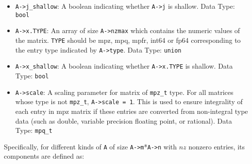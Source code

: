 \documentclass[12pt]{article}
\theoremstyle{definition}
\begin{document}
\begin{itemize}
\item \verb|A->j_shallow|: A boolean indicating whether \verb|A->j| is shallow.
Data Type: \verb|bool|

\item \verb|A->x.TYPE|: An array of size \verb|A->nzmax| which contains the
numeric values of the matrix. \verb|TYPE| should be mpz, mpq, mpfr, int64 or
fp64 corresponding to the entry type indicated by \verb|A->type|. Data Type:
\verb|union|

\item \verb|A->x_shallow|: A boolean indicating whether \verb|A->x.TYPE| is
shallow. Data Type: \verb|bool|

\item \verb|A->scale|: A scaling parameter for matrix of \verb|mpz_t| type. For
all matrices whose type is not \verb|mpz_t|, \verb|A->scale = 1|. This is used
to ensure integrality of each entry in mpz matrix if these entries are converted
from non-integral type data (such as double, variable precision floating
point, or rational). Data Type: \verb|mpq_t|

\end{itemize}

Specifically, for different kinds of \verb|A| of size \verb|A->m|*\verb|A->n| with $nz$ nonzero entries, its components are defined as:
\end{document}
